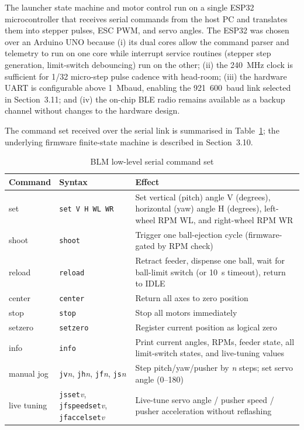 The launcher state machine and motor control run on a single ESP32 microcontroller \cite{ref43_esp32} that receives serial commands from the host PC and translates them into stepper pulses, ESC PWM, and servo angles. The ESP32 was chosen over an Arduino UNO because (i) its dual cores allow the command parser and telemetry to run on one core while interrupt service routines (stepper step generation, limit-switch debouncing) run on the other; (ii) the 240~MHz clock is sufficient for 1/32 micro-step pulse cadence with head-room; (iii) the hardware UART is configurable above 1~Mbaud, enabling the 921~600~baud link selected in Section~3.11; and (iv) the on-chip BLE radio remains available as a backup channel without changes to the hardware design.

The command set received over the serial link is summarised in Table~\ref{tab:3_2}; the underlying firmware finite-state machine is described in Section~3.10.

\begin{table}[htbp]
\caption{BLM low-level serial command set}
\label{tab:3_2}
\centering
\begin{tabularx}{\textwidth}{|l|l|X|}
\hline
\textbf{Command} & \textbf{Syntax} & \textbf{Effect} \\
\hline
set & \texttt{set V H WL WR} & Set vertical (pitch) angle V (degrees), horizontal (yaw) angle H (degrees), left-wheel RPM WL, and right-wheel RPM WR \\
\hline
shoot & \texttt{shoot} & Trigger one ball-ejection cycle (firmware-gated by RPM check) \\
\hline
reload & \texttt{reload} & Retract feeder, dispense one ball, wait for ball-limit switch (or 10~s timeout), return to IDLE \\
\hline
center & \texttt{center} & Return all axes to zero position \\
\hline
stop & \texttt{stop} & Stop all motors immediately \\
\hline
setzero & \texttt{setzero} & Register current position as logical zero \\
\hline
info & \texttt{info} & Print current angles, RPMs, feeder state, all limit-switch states, and live-tuning values \\
\hline
manual jog & \texttt{jv}\textit{n}, \texttt{jh}\textit{n}, \texttt{jf}\textit{n}, \texttt{js}\textit{n} & Step pitch/yaw/pusher by \textit{n} steps; set servo angle (0--180) \\
\hline
live tuning & \texttt{jsset}\textit{v}, \texttt{jfspeedset}\textit{v}, \texttt{jfaccelset}\textit{v} & Live-tune servo angle / pusher speed / pusher acceleration without reflashing \\
\hline
\end{tabularx}
\end{table}

